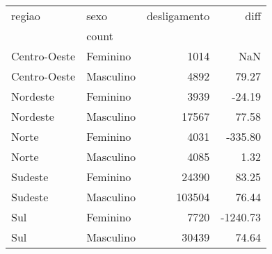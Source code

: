 \begin{tabular}{llrr}
\toprule
      regiao &      sexo & desligamento &     diff \\
             & \multicolumn{2}{l}{count} \\
\midrule
Centro-Oeste &  Feminino &         1014 &      NaN \\
Centro-Oeste & Masculino &         4892 &    79.27 \\
    Nordeste &  Feminino &         3939 &   -24.19 \\
    Nordeste & Masculino &        17567 &    77.58 \\
       Norte &  Feminino &         4031 &  -335.80 \\
       Norte & Masculino &         4085 &     1.32 \\
     Sudeste &  Feminino &        24390 &    83.25 \\
     Sudeste & Masculino &       103504 &    76.44 \\
         Sul &  Feminino &         7720 & -1240.73 \\
         Sul & Masculino &        30439 &    74.64 \\
\bottomrule
\end{tabular}
